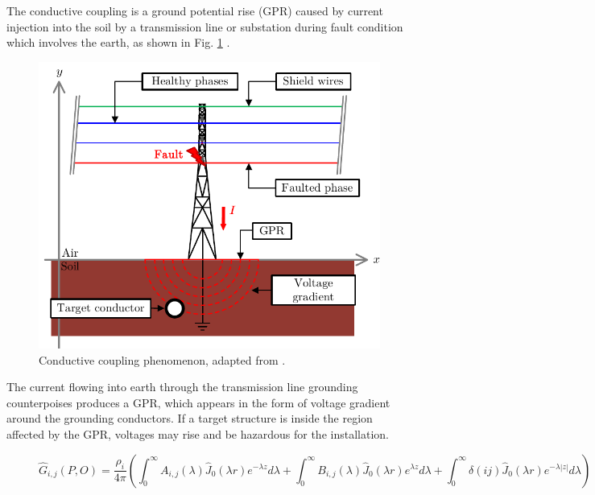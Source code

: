 \documentclass{IEEEtran4PSCC}
\begin{document}
The conductive coupling is a ground potential rise (GPR) caused by current injection into the soil by a transmission line or substation during fault condition which involves the earth, as shown in Fig. \ref{fig:ConductiveCoupling} \cite{CIGREWG36}.

\begin{figure}[hbt]
	\begin{center}
		\includegraphics[width=1\columnwidth]{./fig/condu_coup.pdf}
		\caption{Conductive coupling phenomenon, adapted from \cite{Martins-Britto2020}.}
		\label{fig:ConductiveCoupling}
	\end{center}
\end{figure} 

The current flowing into earth through the transmission line grounding counterpoises produces a GPR, which appears in the form of voltage gradient around the grounding conductors. If a target structure is inside the region affected by the GPR, voltages may rise and be hazardous for the installation.

\begin{figure} [t]

	\begin{equation}\label{eq:Green}
		\hat{G}_{i,j}(P,O) =  \frac{\rho_{i}}{4\pi} \left( \int_{0}^{\infty}A_{i,j}(\lambda)\hat{J}_{0}(\lambda r) e^{-\lambda z}d\lambda  + \int_{0}^{\infty} B_{i,j}(\lambda)\hat{J}_{0}(\lambda r) e^{\lambda z}d\lambda +  \int_{0}^{\infty} \delta(ij)\hat{J}_{0}(\lambda r) e^{-\lambda |z|}d\lambda \right)
	\end{equation}
	\hrulefill
\end{figure}
\end{document}
